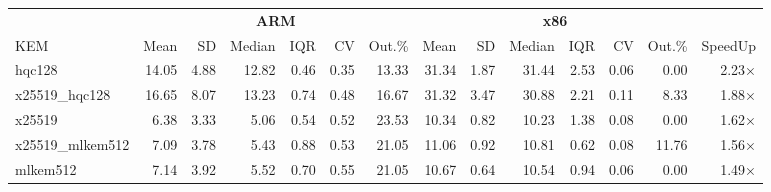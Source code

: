\begin{table}[!ht]
\centering
\begin{tabular}{l|rrrrrr|rrrrrr|r}
\toprule
& \multicolumn{6}{c}{\bfseries ARM} & \multicolumn{6}{c}{\bfseries x86} & \\
\cmidrule(lr){2-7} \cmidrule(lr){8-13}
KEM & Mean & SD & Median & IQR & CV & Out.\% & Mean & SD & Median & IQR & CV & Out.\% & SpeedUp \\
\midrule
hqc128 & 14.05 & 4.88 & 12.82 & 0.46 & 0.35 & 13.33 & 31.34 & 1.87 & 31.44 & 2.53 & 0.06 & 0.00 & 2.23× \\
x25519_hqc128 & 16.65 & 8.07 & 13.23 & 0.74 & 0.48 & 16.67 & 31.32 & 3.47 & 30.88 & 2.21 & 0.11 & 8.33 & 1.88× \\
x25519 & 6.38 & 3.33 & 5.06 & 0.54 & 0.52 & 23.53 & 10.34 & 0.82 & 10.23 & 1.38 & 0.08 & 0.00 & 1.62× \\
x25519_mlkem512 & 7.09 & 3.78 & 5.43 & 0.88 & 0.53 & 21.05 & 11.06 & 0.92 & 10.81 & 0.62 & 0.08 & 11.76 & 1.56× \\
mlkem512 & 7.14 & 3.92 & 5.52 & 0.70 & 0.55 & 21.05 & 10.67 & 0.64 & 10.54 & 0.94 & 0.06 & 0.00 & 1.49× \\
\bottomrule
\end{tabular}
\end{table}
